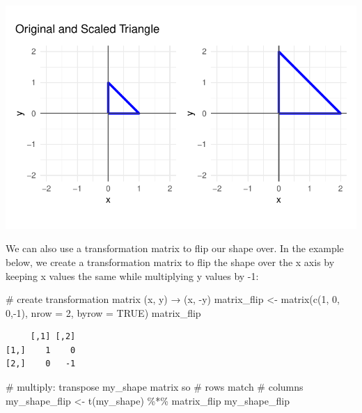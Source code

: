 \documentclass[
  letterpaper,
  DIV=11,
  numbers=noendperiod]{scrartcl}
\newenvironment{Shaded}{\begin{snugshade}}{\end{snugshade}}
\newcommand{\AttributeTok}[1]{\textcolor[rgb]{0.40,0.45,0.13}{#1}}
\newcommand{\CommentTok}[1]{\textcolor[rgb]{0.37,0.37,0.37}{#1}}
\newcommand{\ConstantTok}[1]{\textcolor[rgb]{0.56,0.35,0.01}{#1}}
\newcommand{\DecValTok}[1]{\textcolor[rgb]{0.68,0.00,0.00}{#1}}
\newcommand{\FunctionTok}[1]{\textcolor[rgb]{0.28,0.35,0.67}{#1}}
\newcommand{\NormalTok}[1]{\textcolor[rgb]{0.00,0.23,0.31}{#1}}
\newcommand{\OtherTok}[1]{\textcolor[rgb]{0.00,0.23,0.31}{#1}}
\newcommand{\SpecialCharTok}[1]{\textcolor[rgb]{0.37,0.37,0.37}{#1}}
\begin{document}
\includegraphics{Assignment-1---Fox_files/figure-pdf/scale-1.pdf}

We can also use a transformation matrix to flip our shape over. In the
example below, we create a transformation matrix to flip the shape over
the x axis by keeping x values the same while multiplying y values by
-1:

\begin{Shaded}
\begin{Highlighting}[]
\CommentTok{\# create transformation matrix (x, y) → (x, {-}y)}
\NormalTok{matrix\_flip }\OtherTok{\textless{}{-}} \FunctionTok{matrix}\NormalTok{(}\FunctionTok{c}\NormalTok{(}\DecValTok{1}\NormalTok{, }\DecValTok{0}\NormalTok{,}
                        \DecValTok{0}\NormalTok{,}\SpecialCharTok{{-}}\DecValTok{1}\NormalTok{),}
                       \AttributeTok{nrow =} \DecValTok{2}\NormalTok{, }\AttributeTok{byrow =} \ConstantTok{TRUE}\NormalTok{)}
\NormalTok{matrix\_flip}
\end{Highlighting}
\end{Shaded}

\begin{verbatim}
     [,1] [,2]
[1,]    1    0
[2,]    0   -1
\end{verbatim}

\begin{Shaded}
\begin{Highlighting}[]
\CommentTok{\# multiply: transpose my\_shape matrix so \# rows match \# columns }
\NormalTok{my\_shape\_flip }\OtherTok{\textless{}{-}} \FunctionTok{t}\NormalTok{(my\_shape) }\SpecialCharTok{\%*\%}\NormalTok{ matrix\_flip }
\NormalTok{my\_shape\_flip}
\end{Highlighting}
\end{Shaded}
\end{document}
